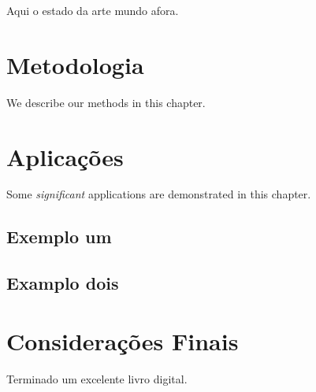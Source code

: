 \documentclass[
]{book}
\begin{document}
Aqui o estado da arte mundo afora.

\hypertarget{metodologia}{%
\chapter{Metodologia}\label{metodologia}}

We describe our methods in this chapter.

\hypertarget{aplicauxe7uxf5es}{%
\chapter{Aplicações}\label{aplicauxe7uxf5es}}

Some \emph{significant} applications are demonstrated in this chapter.

\hypertarget{exemplo-um}{%
\section{Exemplo um}\label{exemplo-um}}

\hypertarget{examplo-dois}{%
\section{Examplo dois}\label{examplo-dois}}

\hypertarget{considerauxe7uxf5es-finais}{%
\chapter{Considerações Finais}\label{considerauxe7uxf5es-finais}}

Terminado um excelente livro digital.

  
\end{document}
